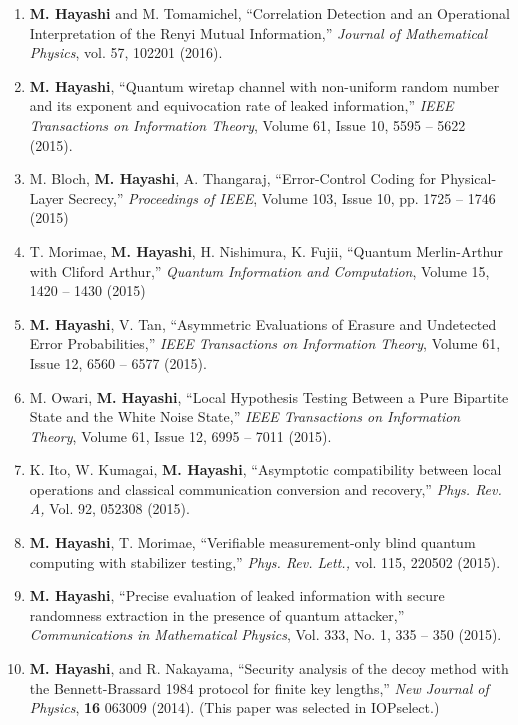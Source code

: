 \documentclass[a4paper,12pt,oneside]{article}
\begin{document}
\begin{enumerate}
\item 
\textbf{M. Hayashi} and M. Tomamichel, 
``Correlation Detection and an Operational Interpretation of the Renyi Mutual Information,'' 
{\em Journal of Mathematical Physics}, vol. 57, 102201 (2016).

\item 
\textbf{M. Hayashi}, ``Quantum wiretap channel with non-uniform random number and its exponent and equivocation rate of leaked information,'' 
{\em IEEE Transactions on Information Theory}, Volume 61, Issue 10, 5595 -- 5622 (2015). 

\item 
M. Bloch, \textbf{M. Hayashi}, A. Thangaraj, ``Error-Control Coding for Physical-Layer Secrecy,'' 
{\em Proceedings of IEEE}, Volume 103, Issue 10, pp. 1725 -- 1746 (2015) 

\item 
T. Morimae, \textbf{M. Hayashi}, H. Nishimura, K. Fujii, ``Quantum Merlin-Arthur with Cliford Arthur,'' 
{\em Quantum Information and Computation}, 
Volume 15, 1420 -- 1430 (2015)

\item 
\textbf{M. Hayashi}, V. Tan, ``Asymmetric Evaluations of Erasure and Undetected Error Probabilities,'' 
{\em IEEE Transactions on Information Theory}, Volume 61, Issue 12, 6560 -- 6577 (2015). 

\item 
M. Owari, \textbf{M. Hayashi}, ``Local Hypothesis Testing Between a Pure Bipartite State and the White Noise State,'' 
{\em IEEE Transactions on Information Theory}, 
Volume 61, Issue 12, 6995 -- 7011 (2015).

\item 
K. Ito, W. Kumagai, \textbf{M. Hayashi}, ``Asymptotic compatibility between local operations and classical communication conversion and recovery,'' 
{\em Phys. Rev. A,} Vol. 92, 052308 (2015). 

\item 
\textbf{M. Hayashi}, T. Morimae, ``Verifiable measurement-only blind quantum computing with stabilizer testing,'' 
{\em Phys. Rev. Lett.,} vol. 115, 220502 (2015). 

\item 
\textbf{M. Hayashi},
``Precise evaluation of leaked information with secure randomness extraction in the
presence of quantum attacker,'' {\em Communications in Mathematical Physics},
Vol. 333, No. 1, 335 -- 350 (2015).

\item 
\textbf{M. Hayashi}, and R. Nakayama, 
``Security analysis of the decoy method with the Bennett-Brassard 1984 protocol for finite key lengths,'' 
{\em New Journal of Physics}, {\bf 16} 063009 (2014).
(This paper was selected in IOPselect.)


\end{enumerate}
\end{document}
